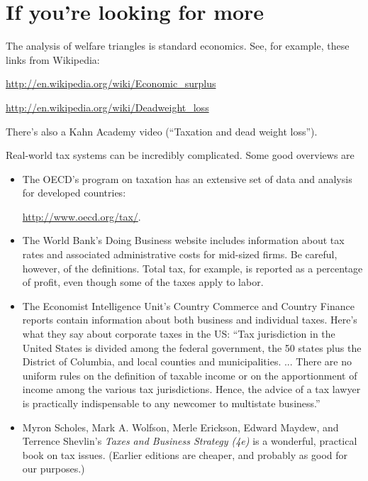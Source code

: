 \section*{If you're looking for more}

The analysis of welfare triangles is standard economics.
See, for example, these links from Wikipedia:

\vspace*{\parskip}
\centerline{\url{http://en.wikipedia.org/wiki/Economic_surplus}}
\centerline{\url{http://en.wikipedia.org/wiki/Deadweight_loss}}

There's also a Kahn Academy video (``Taxation and dead weight loss'').

Real-world tax systems can be incredibly complicated.
Some good overviews are
%
\begin{itemize}
\item The OECD's program on taxation  has an extensive
set of data and analysis for developed countries:

\vspace*{\parskip}
\centerline{\url{http://www.oecd.org/tax/}.}

\item The World Bank's Doing Business website includes information about
tax rates and associated administrative costs for mid-sized firms.
Be careful, however, of the definitions.
Total tax, for example, is reported as a percentage of
profit, even though some of the taxes
apply to labor.


\item The Economist Intelligence Unit's Country Commerce
and Country Finance reports contain information about
both business and individual taxes.
Here's what they say about corporate taxes in the US:
``Tax jurisdiction in the United States is divided among the federal
government, the 50 states plus the District of Columbia,
and local counties and municipalities. ...
There are no uniform rules on the definition of taxable income or on the
apportionment of income among the various tax jurisdictions.
Hence, the advice of a tax lawyer is practically indispensable
to any newcomer to multistate business.''

\item
 Myron Scholes, Mark A. Wolfson, Merle Erickson, Edward Maydew, and
 Terrence Shevlin's {\it Taxes and Business Strategy (4e)\/}
 is a wonderful, practical book on tax issues.
 (Earlier editions are cheaper, and probably as good for our purposes.)

\end{itemize}

